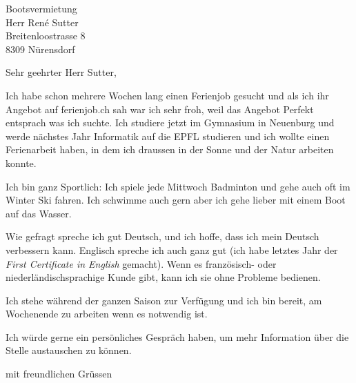 \documentclass[10pt,a4paper]{letter}
\date{12. März 2018}
\begin{document}
 
\begin{letter}{Bootsvermietung \\ Herr René Sutter \\ Breitenloostrasse 8 \\ 8309 Nürensdorf} 
\opening{Sehr geehrter Herr Sutter,} 
 
Ich habe schon mehrere Wochen lang einen Ferienjob gesucht und als ich ihr Angebot auf ferienjob.ch sah war ich sehr froh, weil das Angebot Perfekt entsprach was ich suchte. Ich studiere jetzt im Gymnasium in Neuenburg und werde nächstes Jahr Informatik auf die EPFL studieren und ich wollte einen Ferienarbeit haben, in dem ich draussen in der Sonne und der Natur arbeiten konnte.


Ich bin ganz Sportlich: Ich spiele jede Mittwoch Badminton und gehe auch oft im Winter Ski fahren. Ich schwimme auch gern aber ich gehe lieber mit einem Boot auf das Wasser. 


Wie gefragt spreche ich gut Deutsch, und ich hoffe, dass ich mein Deutsch verbessern kann. Englisch spreche ich auch ganz gut (ich habe letztes Jahr der \textit{First Certificate in English} gemacht). Wenn es französisch- oder niederländischsprachige Kunde gibt, kann ich sie ohne Probleme bedienen.


Ich stehe während der ganzen Saison zur Verfügung und ich bin bereit, am Wochenende zu arbeiten wenn es notwendig ist.


Ich würde gerne ein persönliches Gespräch haben, um mehr Information über die Stelle austauschen zu können.

 
\closing{mit freundlichen Grüssen} 
\end{letter} 
\end{document}
